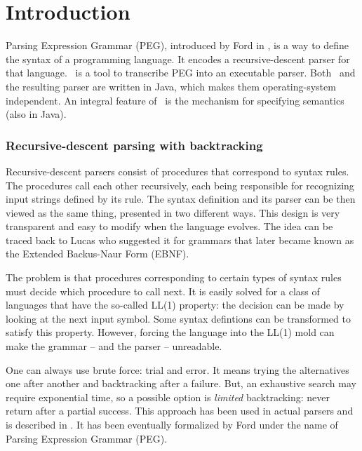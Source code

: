 
\section{Introduction}


Parsing Expression Grammar (PEG),
introduced by Ford in \cite{Ford:2004},
is a way to define the syntax of a programming language.
It encodes a recursive-descent parser for that language.
\Mouse\ is a tool to transcribe PEG into an executable parser.
Both \Mouse\ and the resulting parser are written in Java,
which makes them operating-system independent.
An integral feature of \Mouse\ is the mechanism for specifying
semantics (also in Java).

\subsubsection*{Recursive-descent parsing with backtracking}

Recursive-descent parsers consist of procedures that correspond to syntax rules.
The procedures call each other recursively, each being responsible for recognizing
input strings defined by its rule.
The syntax definition and its parser can be then viewed as the same thing,
presented in two different ways.
This design is very transparent and easy to modify when the language evolves.
The idea can be traced back to Lucas \cite{Lucas:1961}
who suggested it for grammars that later became known as the
Extended Backus-Naur Form (EBNF).

The problem is that procedures corresponding to certain types of syntax rules must decide
which procedure to call next.
It is easily solved for a class of languages that have the so-called LL(1) property:
the decision can be made by looking at the next input symbol.
Some syntax defintions can be transformed to satisfy this property.
However, forcing the language into the LL(1) mold
can make the grammar -- and the parser -- unreadable.

One can always use brute force: trial and error.
It means trying the alternatives one after another and backtracking after a failure.
But, an exhaustive search
may require exponential time,
so a possible option is \emph{limited} backtracking: never return after a partial success.
This approach has been used in actual parsers \cite{Brooker:Morris:1962,McClure:1965} 
and is described in \cite{Birman:1970,Birman:Ullman:1973,Hopgood:1969,Aho:Ullman:1972}.
It has been eventually formalized by Ford \cite{Ford:2004} under the name of Parsing Expression Grammar (PEG).


